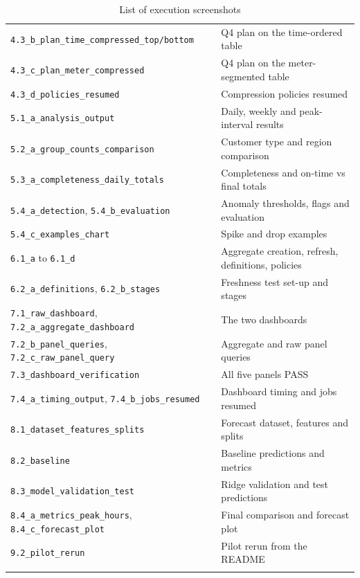 \documentclass[11pt,a4paper]{article}
\begin{document}
{\begin{longtable}{p{7.4cm}p{7.6cm}}
\texttt{4.3\_b\_plan\_time\_compressed\_top/bottom} & Q4 plan on the time-ordered table \\
\texttt{4.3\_c\_plan\_meter\_compressed} & Q4 plan on the meter-segmented table \\
\texttt{4.3\_d\_policies\_resumed} & Compression policies resumed \\
\texttt{5.1\_a\_analysis\_output} & Daily, weekly and peak-interval results \\
\texttt{5.2\_a\_group\_counts\_comparison} & Customer type and region comparison \\
\texttt{5.3\_a\_completeness\_daily\_totals} & Completeness and on-time vs final totals \\
\texttt{5.4\_a\_detection}, \texttt{5.4\_b\_evaluation} & Anomaly thresholds, flags and evaluation \\
\texttt{5.4\_c\_examples\_chart} & Spike and drop examples \\
\texttt{6.1\_a} to \texttt{6.1\_d} & Aggregate creation, refresh, definitions, policies \\
\texttt{6.2\_a\_definitions}, \texttt{6.2\_b\_stages} & Freshness test set-up and stages \\
\texttt{7.1\_raw\_dashboard}, \texttt{7.2\_a\_aggregate\_dashboard} & The two dashboards \\
\texttt{7.2\_b\_panel\_queries}, \texttt{7.2\_c\_raw\_panel\_query} & Aggregate and raw panel queries \\
\texttt{7.3\_dashboard\_verification} & All five panels PASS \\
\texttt{7.4\_a\_timing\_output}, \texttt{7.4\_b\_jobs\_resumed} & Dashboard timing and jobs resumed \\
\texttt{8.1\_dataset\_features\_splits} & Forecast dataset, features and splits \\
\texttt{8.2\_baseline} & Baseline predictions and metrics \\
\texttt{8.3\_model\_validation\_test} & Ridge validation and test predictions \\
\texttt{8.4\_a\_metrics\_peak\_hours}, \texttt{8.4\_c\_forecast\_plot} & Final comparison and forecast plot \\
\texttt{9.2\_pilot\_rerun} & Pilot rerun from the README \\
\bottomrule
\caption{List of execution screenshots}
\end{longtable}}
\end{document}
